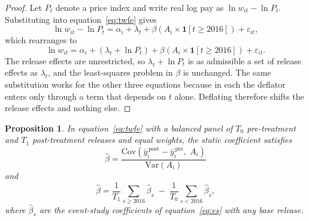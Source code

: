 \documentclass[12pt,leqno]{article}
\newtheorem{proposition}{Proposition}
\begin{document}
\begin{proof}
Let $P_t$ denote a price index and write real log pay as $\ln w_{it} - \ln P_t$. Substituting into equation~\eqref{eq:twfe} gives
\begin{equation}
\ln w_{it} - \ln P_t = \alpha_i + \lambda_t + \beta \left( A_i \times \mathbf{1}[t \geq 2016] \right) + \varepsilon_{it},
\end{equation}
which rearranges to
\begin{equation}
\ln w_{it} = \alpha_i + \left(\lambda_t + \ln P_t\right) + \beta \left( A_i \times \mathbf{1}[t \geq 2016] \right) + \varepsilon_{it}.
\end{equation}
The release effects are unrestricted, so $\lambda_t + \ln P_t$ is as admissible a set of release effects as $\lambda_t$, and the least-squares problem in $\beta$ is unchanged. The same substitution works for the other three equations because in each the deflator enters only through a term that depends on $t$ alone. Deflating therefore shifts the release effects and nothing else.
\end{proof}

\begin{proposition}\label{prop:static}
In equation~\eqref{eq:twfe} with a balanced panel of $T_0$ pre-treatment and $T_1$ post-treatment releases and equal weights, the static coefficient satisfies
\begin{equation}\label{eq:fwl}
\hat{\beta} = \frac{\mathrm{Cov}\!\left(\bar{y}^{\,\mathrm{post}}_i - \bar{y}^{\,\mathrm{pre}}_i,\; A_i\right)}{\mathrm{Var}\!\left(A_i\right)}
\end{equation}
and
\begin{equation}\label{eq:esavg}
\hat{\beta} = \frac{1}{T_1}\sum_{s \geq 2016} \hat{\beta}_s \;-\; \frac{1}{T_0}\sum_{s < 2016} \hat{\beta}_s ,
\end{equation}
where $\hat{\beta}_s$ are the event-study coefficients of equation~\eqref{eq:es} with any base release.
\end{proposition}
\end{document}

